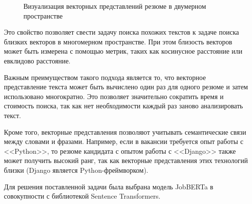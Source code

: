 \documentclass[14pt]{mmcs_article}
\begin{document}
\begin{figure}[h]
  \centering
  \caption{\centering Визуализация векторных представлений резюме в двумерном пространстве}
  \label{fig:embedding_visualization}
\end{figure}

Это свойство позволяет свести задачу поиска похожих текстов к задаче поиска близких векторов в многомерном пространстве. При этом близость векторов может быть измерена с помощью метрик, таких как косинусное расстояние или евклидово расстояние.

Важным преимуществом такого подхода является то, что векторное представление текста может быть вычислено один раз для одного резюме и затем использовано многократно. Это позволяет значительно сократить время и стоимость поиска, так как нет необходимости каждый раз заново анализировать текст.

Кроме того, векторные представления позволяют учитывать семантические связи между словами и фразами. Например, если в вакансии требуется опыт работы с <<Python>>, то резюме кандидата с опытом работы с <<Django>> также может получить высокий ранг, так как векторные представления этих технологий близки (Django является Python-фреймворком).

Для решения поставленной задачи была выбрана модель JobBERTa в совокупности с библиотекой Sentence Transformers.
\end{document}
